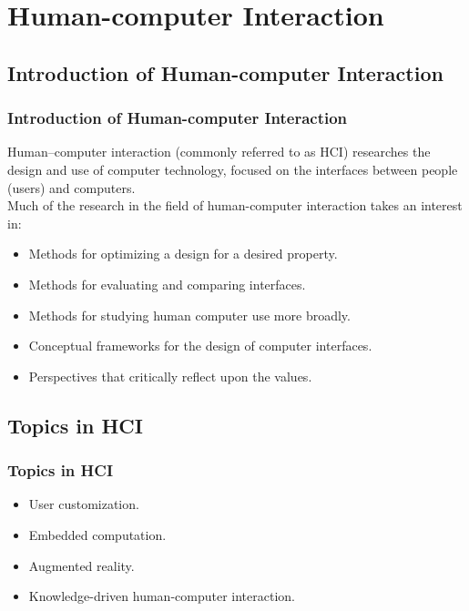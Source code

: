 \documentclass{beamer}
\begin{document}
\section{Human-computer Interaction}

\subsection{Introduction of Human-computer Interaction}

\begin{frame}
  \frametitle{Introduction of Human-computer Interaction}
  \qquad Human–computer interaction (commonly referred to as HCI) researches the design and use of computer technology, focused on the interfaces between people (users) and computers. \\
  \qquad Much of the research in the field of human-computer interaction takes an interest in:
  \begin{itemize}
    \item Methods for optimizing a design for a desired property.
    \item Methods for evaluating and comparing interfaces.
    \item Methods for studying human computer use more broadly.
    \item Conceptual frameworks for the design of computer interfaces.
    \item Perspectives that critically reflect upon the values.

  \end{itemize}
\end{frame}

\subsection{Topics in HCI}
\begin{frame}
  \frametitle{Topics in HCI}
  \begin{itemize}
    \item User customization.
    \item Embedded computation.
    \item Augmented reality.
    \item Knowledge-driven human-computer interaction.

  \end{itemize}
\end{frame}
\end{document}
